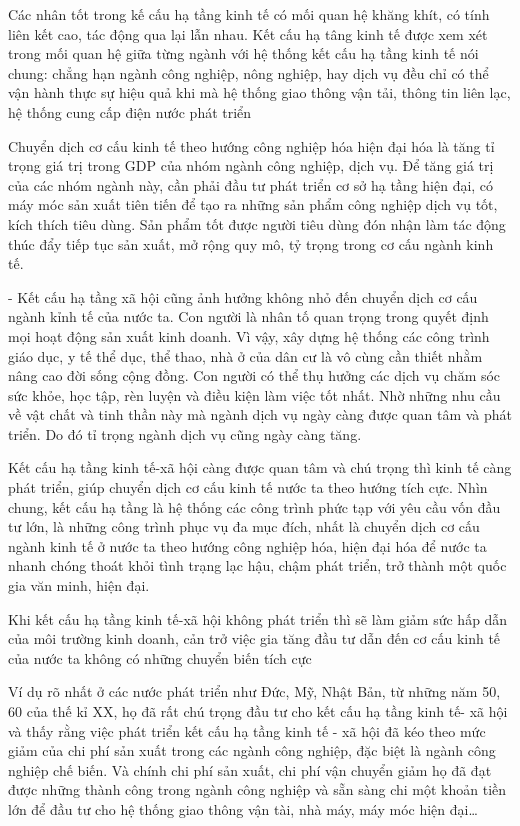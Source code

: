 Các nhân tốt trong kế cấu hạ tầng kinh tế có mối quan hệ khăng khít, có tính liên kết cao, tác động qua lại lẫn nhau. Kết cấu hạ tâng kinh tế được xem xét trong mối quan hệ giữa từng ngành với hệ thống kết cấu hạ tầng kinh tế nói chung: chẳng hạn ngành công nghiệp, nông nghiệp, hay dịch vụ đều chỉ có thể vận hành thực sự hiệu quả khi mà hệ thống giao thông vận tải, thông tin liên lạc, hệ thống cung cấp điện nước phát triển

Chuyển dịch cơ cấu kinh tế theo hướng công nghiệp hóa hiện đại hóa là tăng tỉ trọng giá trị trong GDP của nhóm ngành công nghiệp, dịch vụ. Để tăng giá trị của các nhóm ngành này, cần phải đầu tư phát triển cơ sở hạ tầng hiện đại, có máy móc sản xuất tiên tiến để tạo ra những sản phẩm công nghiệp dịch vụ tốt, kích thích tiêu dùng. Sản phẩm tốt được người tiêu dùng đón nhận làm tác động thúc đẩy tiếp tục sản xuất, mở rộng quy mô, tỷ trọng trong cơ cấu ngành kinh tế.

- Kết cấu hạ tầng xã hội cũng ảnh hưởng không nhỏ đến chuyển dịch cơ cấu ngành kỉnh tế của nước ta. Con người là nhân tố quan trọng trong quyết định mọi hoạt động sản xuất kinh doanh. Vì vậy, xây dựng hệ thống các công trình giáo dục, y tế thể dục, thể thao, nhà ở của dân cư là vô cùng cần thiết nhằm nâng cao đời sống cộng đồng. Con người có thể thụ hưởng các dịch vụ chăm sóc sức khỏe, học tập, rèn luyện và điều kiện làm việc tốt nhất. Nhờ những nhu cầu về vật chất và tinh thần này mà ngành dịch vụ ngày càng được quan tâm và phát triển. Do đó tỉ trọng ngành dịch vụ cũng ngày càng tăng. 

Kết cấu hạ tầng kinh tế-xã hội càng được quan tâm và chú trọng thì kinh tế càng phát triển, giúp chuyển dịch cơ cấu kinh tế nước ta theo hướng tích cực. Nhìn chung, kết cấu hạ tầng là hệ thống các công trình phức tạp với yêu cầu vốn đầu tư lớn, là những công trình phục vụ đa mục đích, nhất là chuyển dịch cơ cấu ngành kinh tế ở nước ta theo hướng công nghiệp hóa, hiện đại hóa để nước ta nhanh chóng thoát khỏi tình trạng lạc hậu, chậm phát triển, trở thành một quốc gia văn minh, hiện đại.

Khi kết cấu hạ tầng kinh tế-xã hội không phát triển thì sẽ làm giảm sức hấp dẫn của môi trường kinh doanh, cản trở việc gia tăng đầu tư dẫn đến cơ cấu kinh tế của nước ta không có những chuyển biến tích cực

Ví dụ rõ nhất ở các nước phát triển như Đức, Mỹ, Nhật Bản, từ những năm 50, 60 của thế kỉ XX, họ đã rất chú trọng đầu tư cho kết cấu hạ tầng kinh tế- xã hội và thấy rằng việc phát triển kết cấu hạ tầng kinh tế - xã hội đã kéo theo mức giảm của chi phí sản xuất trong các ngành công nghiệp, đặc biệt là ngành công nghiệp chế biến. Và chính chi phí sản xuất, chi phí vận chuyển giảm họ đã đạt được những thành công trong ngành công nghiệp và sẵn sàng chi một khoản tiền lớn để đầu tư cho hệ thống giao thông vận tài, nhà máy, máy móc hiện đại…

